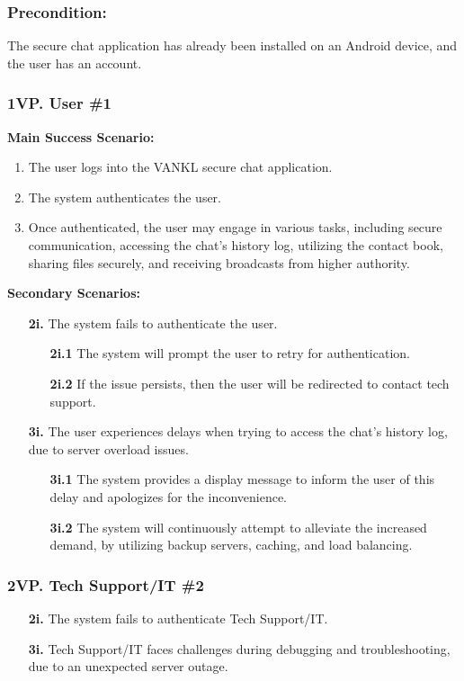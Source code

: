 \documentclass[]{article}
\begin{document}
\subsubsection*{Precondition:} The secure chat application has already been installed on an Android device, and the user has an account.
\subsubsection*{1VP. User \#1}
\textbf{Main Success Scenario:}
\begin{enumerate}
	\item The user logs into the VANKL secure chat application.
	\item The system authenticates the user.
	\item Once authenticated, the user may engage in various tasks, including secure communication, accessing the chat’s history log, utilizing the contact book, sharing files securely, and receiving broadcasts from higher authority.
\end{enumerate}
\textbf{Secondary Scenarios:}
\begin{enumerate}
	\item[\textbf{2i.}] The system fails to authenticate the user.
		\begin{enumerate}
			\item[\textbf{2i.1}] The system will prompt the user to retry for authentication.
			\item[\textbf{2i.2}] If the issue persists, then the user will be redirected to contact tech support.
		\end{enumerate}
	\item[\textbf{3i.}] The user experiences delays when trying to access the chat’s history log, due to server overload issues.
		\begin{enumerate}
			\item[\textbf{3i.1}] The system provides a display message to inform the user of this delay and apologizes for the inconvenience.
			\item[\textbf{3i.2}] The system will continuously attempt to alleviate the increased demand, by utilizing backup servers, caching, and load balancing.
		\end{enumerate}
\end{enumerate}
\subsubsection*{2VP. Tech Support/IT \#2}
\begin{enumerate}
	\item[\textbf{2i.}] The system fails to authenticate Tech Support/IT.
	\item[\textbf{3i.}] Tech Support/IT faces challenges during debugging and troubleshooting, due to an unexpected server outage.
\end{enumerate}
\end{document}
